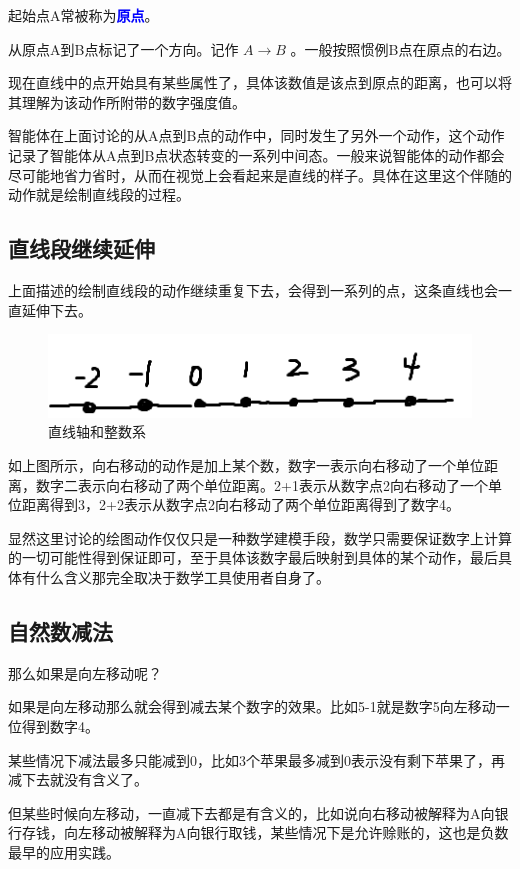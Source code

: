\documentclass[12pt,oneside]{book}
\renewcommand{\emph}[1]{\textcolor{blue}{\textbf{#1}}}
\begin{document}
起始点A常被称为\emph{原点}。

从原点A到B点标记了一个方向。记作 $A \to B$ 。一般按照惯例B点在原点的右边。

现在直线中的点开始具有某些属性了，具体该数值是该点到原点的距离，也可以将其理解为该动作所附带的数字强度值。

智能体在上面讨论的从A点到B点的动作中，同时发生了另外一个动作，这个动作记录了智能体从A点到B点状态转变的一系列中间态。一般来说智能体的动作都会尽可能地省力省时，从而在视觉上会看起来是直线的样子。具体在这里这个伴随的动作就是绘制直线段的过程。

\subsection{直线段继续延伸}
上面描述的绘制直线段的动作继续重复下去，会得到一系列的点，这条直线也会一直延伸下去。

\begin{figure}[H]
\centering
\includegraphics[width=\linewidth ,totalheight=0.95\textheight , keepaspectratio]{直线轴和整数系.png}
\caption{直线轴和整数系}
\end{figure}

如上图所示，向右移动的动作是加上某个数，数字一表示向右移动了一个单位距离，数字二表示向右移动了两个单位距离。2+1表示从数字点2向右移动了一个单位距离得到3，2+2表示从数字点2向右移动了两个单位距离得到了数字4。

显然这里讨论的绘图动作仅仅只是一种数学建模手段，数学只需要保证数字上计算的一切可能性得到保证即可，至于具体该数字最后映射到具体的某个动作，最后具体有什么含义那完全取决于数学工具使用者自身了。

\subsection{自然数减法}
那么如果是向左移动呢？

如果是向左移动那么就会得到减去某个数字的效果。比如5-1就是数字5向左移动一位得到数字4。

某些情况下减法最多只能减到0，比如3个苹果最多减到0表示没有剩下苹果了，再减下去就没有含义了。

但某些时候向左移动，一直减下去都是有含义的，比如说向右移动被解释为A向银行存钱，向左移动被解释为A向银行取钱，某些情况下是允许赊账的，这也是负数最早的应用实践。
\end{document}
